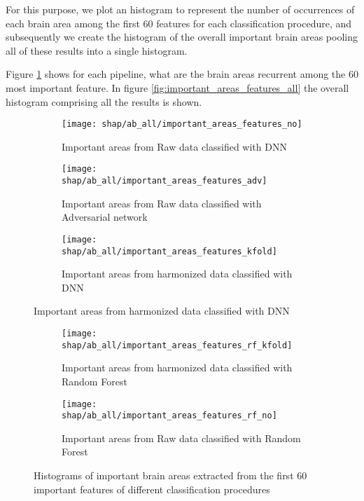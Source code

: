 \documentclass[11pt]{report}
\begin{document}
For this purpose, we plot an histogram to represent the number of occurrences of each brain area among the first 60 features for each classification procedure, and subsequently we create the histogram of the overall important brain areas pooling all of these results into a single histogram.

Figure \ref{fig:histograms_60} shows for each pipeline, what are the brain areas recurrent among the 60 most important feature.
In figure \ref{fig:important_areas_features_all} the overall histogram comprising all the results is shown.


\begin{figure}
\centering
\begin{subfigure}[b]{1\columnwidth}
   \texttt{[image: shap/ab\_all/important\_areas\_features\_no]}
   \caption{Important areas from Raw data classified with DNN}
    
\end{subfigure}

\begin{subfigure}[b]{1\columnwidth}
   \texttt{[image: shap/ab\_all/important\_areas\_features\_adv]}
   \caption{Important areas from Raw data classified with Adversarial network}
    
\end{subfigure}

\begin{subfigure}[b]{1\columnwidth}
   \texttt{[image: shap/ab\_all/important\_areas\_features\_kfold]}
   \caption{Important areas from harmonized data classified with DNN}
    
\end{subfigure}
\end{figure}
\begin{figure}\ContinuedFloat
\begin{subfigure}[b]{1\columnwidth}
   \texttt{[image: shap/ab\_all/important\_areas\_features\_rf\_kfold]}
   \caption{Important areas from harmonized data classified with Random Forest}
    
\end{subfigure}

\begin{subfigure}[b]{1\columnwidth}
   \texttt{[image: shap/ab\_all/important\_areas\_features\_rf\_no]}
   \caption{Important areas from Raw data classified with Random Forest}
    
\end{subfigure}
\caption{Histograms of important brain areas extracted from the first 60 important features of different classification procedures}
\label{fig:histograms_60}
\end{figure}
\end{document}
